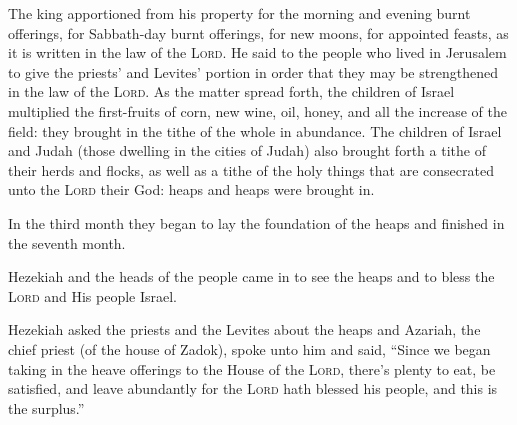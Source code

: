\begin{inparaenum}
     The king apportioned from his property for the morning and evening burnt offerings, for Sabbath-day burnt offerings, for new moons, for appointed feasts, as it is written in the law of the \textsc{Lord}.%
     He said to the people who lived in Jerusalem to give the priests' and Levites' portion in order that they may be strengthened in the law of the \textsc{Lord}.%
     As the matter spread forth, the children of Israel multiplied the first-fruits of corn, new wine, oil, honey, and all the increase of the field: they brought in the tithe of the whole in abundance.%
     The children of Israel and Judah (those dwelling in the cities of Judah) also brought forth a tithe of their herds and flocks, as well as a tithe of the holy things that are consecrated unto the \textsc{Lord} their God: heaps and heaps were brought in.%
    
     In the third month they began to lay the foundation of the heaps and finished in the seventh month.%
    
     Hezekiah and the heads of the people came in to see the heaps and to bless the \textsc{Lord} and His people Israel.%
    
     Hezekiah asked the priests and the Levites about the heaps%
     and Azariah, the chief priest (of the house of Zadok), spoke unto him and said, ``Since we began taking in the heave offerings to the House of the \textsc{Lord}, there's plenty to eat, be satisfied, and leave abundantly for the \textsc{Lord} hath blessed his people, and this is the surplus.''%
    

\end{inparaenum}

